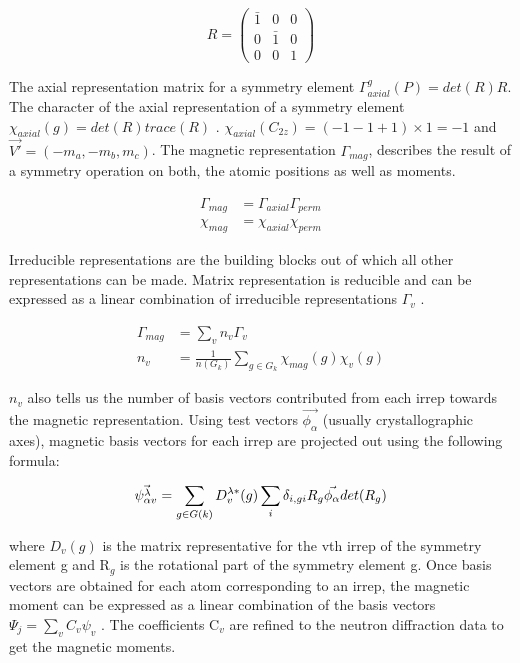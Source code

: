 \documentclass[10pt,doublespacing,edeposit]{uiucthesis2020}
\begin{document}
\begin{mainmatter}
\begin{equation*}
R = \begin{pmatrix} \bar{1} & 0 & 0\\ 0 & \bar{1} & 0\\ 0 & 0 & 1 \end{pmatrix}
\end{equation*}

The axial representation matrix for a symmetry element $\Gamma_{axial}^g(P) = det(R)R$. The character of the axial representation of a symmetry element  $\chi_{axial}(g) = det(R)trace(R)$ \cite{Wills2001}. $\chi_{axial}(C_{2z}) = (-1-1+1) \times 1 = -1$ and $\vec{V'} = (-m_a, -m_b, m_c)$. The magnetic representation $\Gamma_{mag}$, describes the result of a symmetry operation on both, the atomic positions as well as moments.

\begin{align}
\Gamma_{mag} &= \Gamma_{axial} \Gamma_{perm}\\
\chi_{mag} &= \chi_{axial} \chi_{perm}
\end{align}

Irreducible representations are the building blocks out of which all other representations can be made. Matrix representation is reducible and can be expressed as a linear combination of irreducible representations $\Gamma_v$ \cite{Wills2001}.

\begin{align}
\Gamma_{mag} &= \sum_v n_v \Gamma_v \\
n_v &= \frac{1}{n(G_k)} \sum_{g \in G_k} \chi_{mag}(g) \chi_v(g)
\end{align}

$n_v$ also tells us the number of basis vectors contributed from each irrep towards the magnetic representation. Using test vectors $\vec{\phi_{\alpha}}$ (usually crystallographic axes), magnetic basis vectors for each irrep are projected out using the following formula:

\begin{equation}
\vec{\psi_{\alpha v}^\lambda} = \sum_{g \in G(k)} D_v^{\lambda*}(g) \sum_i \delta_{i,gi} R_g \vec{\phi_{\alpha}} det(R_g) \\
\end{equation}

where $D_v(g)$ is the matrix representative for the vth irrep of the symmetry element g and R$_g$ is the rotational part of the symmetry element g. Once basis vectors are obtained for each atom corresponding to an irrep, the magnetic moment can be expressed as a linear combination of the basis vectors $\Psi_j = \sum_v C_v \psi_v$ \cite{Wills2001}. The coefficients C$_v$ are refined to the neutron diffraction data to get the magnetic moments.




\end{mainmatter}
\end{document}
